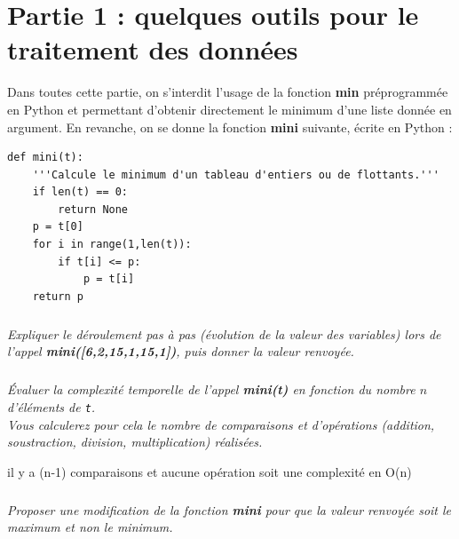 \documentclass[10pt,fleqn]{article} %
\begin{document}

\section*{Partie 1 : quelques outils pour le traitement des données}

Dans toutes cette partie, on s'interdit l'usage de la fonction \textbf{min}
préprogrammée en Python et permettant d'obtenir directement le minimum d'une 
liste donnée en argument. En revanche, on se donne la fonction 
\textbf{mini} suivante, écrite en Python :

\begin{py}
\begin{lstlisting}
def mini(t):
    '''Calcule le minimum d'un tableau d'entiers ou de flottants.'''
    if len(t) == 0:
        return None
    p = t[0]
    for i in range(1,len(t)):
        if t[i] <= p:
            p = t[i]
    return p
\end{lstlisting}
\end{py}

\subparagraph{}
\textit{Expliquer le déroulement pas à pas (évolution de la valeur des
  variables) lors de l'appel   \textbf{mini([6,2,15,1,15,1])}, puis donner la valeur   renvoyée.}
	

\ifprof
\begin{corrige}
\end{corrige}
\else
\fi

\subparagraph{}
\textit{Évaluer la complexité temporelle de l'appel \textbf{mini(t)} en fonction du nombre $n$ 
d'éléments de  \texttt{t}.\\
Vous calculerez pour cela le nombre de comparaisons et d'opérations (addition, soustraction, division, multiplication) réalisées.}

\ifprof
\begin{corrige}
il y a (n-1) comparaisons et aucune opération soit une complexité en O(n)
\end{corrige}
\else
\fi

\subparagraph{}
 \textit{Proposer une modification de la fonction \textbf{mini} pour que la valeur
  renvoyée soit le \emph{maximum} et non le \emph{minimum}.}
	
\end{document}
